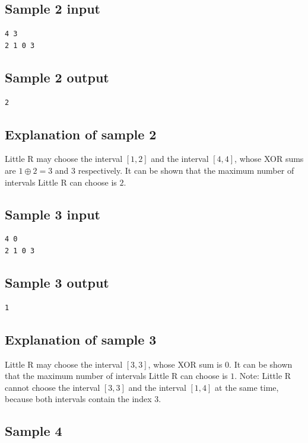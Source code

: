 \documentclass[11pt]{article}
\begin{document}
\subsection*{Sample 2 input}
\begin{verbatim}
4 3
2 1 0 3
\end{verbatim}

\subsection*{Sample 2 output}
\begin{verbatim}
2
\end{verbatim}

\subsection*{Explanation of sample 2}

Little R may choose the interval $[1, 2]$ and the interval $[4, 4]$,
whose XOR sums are $1 \oplus 2 = 3$ and $3$ respectively.
It can be shown that the maximum number of intervals Little R can choose
is $2$.

\subsection*{Sample 3 input}
\begin{verbatim}
4 0
2 1 0 3
\end{verbatim}

\subsection*{Sample 3 output}
\begin{verbatim}
1
\end{verbatim}

\subsection*{Explanation of sample 3}

Little R may choose the interval $[3, 3]$, whose XOR sum is $0$.
It can be shown that the maximum number of intervals Little R can choose
is $1$.
Note: Little R cannot choose the interval $[3, 3]$ and the interval
$[1, 4]$ at the same time, because both intervals contain the index $3$.

\subsection*{Sample 4}
\end{document}
